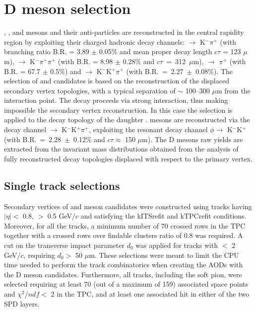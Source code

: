 \section{D meson selection}
\Dzero, \Dplus, \Dstar and \Dsubs mesons and their anti-particles are reconstructed in the central rapidity region by exploiting their charged hadronic decay channels: \Dzero $\rightarrow$ K$^{-}\pi^{+}$ (with branching ratio B.R. = 3.89 $\pm$ 0.05$\%$ and mean proper decay length $c\tau$ = 123 $\mu$m), \Dplus $\rightarrow$ K$^{-}\pi^{+}\pi^{+}$ (with B.R. = 8.98 $\pm$ 0.28$\%$ and \mbox{$c\tau$ = 312 $\mu$m}), \Dstar $\rightarrow$ \Dzero$\pi^{+}$ (with B.R. = 67.7 $\pm$ 0.5$\%$) and \Dsubs $\rightarrow$ K$^{-}$K$^{+}\pi^{+}$ (with \mbox{B.R. = 2.27 $\pm$ 0.08$\%$}).
The selection of \Dzero and \Dplus candidates is based on the reconstruction of the displaced secondary vertex topologies, with a typical separation of $\sim$ 100--300 $\mu$m from the interaction point. The \Dstar decay proceeds via strong interaction, thus making impossible the secondary vertex reconstruction. In this case the selection is applied to the decay topology of the daughter \Dzero. \Dsubs mesons are reconstructed via the decay channel \Dsubs $\rightarrow$ K$^{-}$K$^{+}\pi^{+}$, exploiting the resonant decay channel $\phi \rightarrow$ K$^{-}$K$^{+}$ (with \mbox{B.R. = 2.28 $\pm$ 0.12$\%$} and $c\tau \approx$ 150 $\mu$m).
The D mesons raw yields are extracted from the invariant mass distributions obtained from the analysis of fully reconstructed decay topologies displaced with respect to the primary vertex.
\subsection{Single track selections}
\label{sec:single_track}
Secondary vertices of \Dzero and \Dplus meson candidates were constructed using tracks having $|\eta| <$ 0.8, \pt $>$ 0.5 GeV/$c$ and satisfying the kITSrefit and kTPCrefit conditions. Moreover, for all the tracks, a minimum number of 70 crossed rows in the TPC together with a crossed rows over findable clusters ratio of 0.8 was required. A cut on the transverse impact parameter $d_0$ was applied for tracks with \pt $<$ 2 GeV/$c$, requiring $d_0 >$ 50 $\mu$m. These selections were meant to limit the CPU time needed to perform the track combinatorics when creating the AODs with the D meson candidates. Furthermore, all tracks, including the \Dstar soft pion, were selected requiring at least 70 (out of a maximum of 159) associated space points and $\chi^2$/$ndf <$ 2 in the TPC, and at least one associated hit in either of the two SPD layers.


